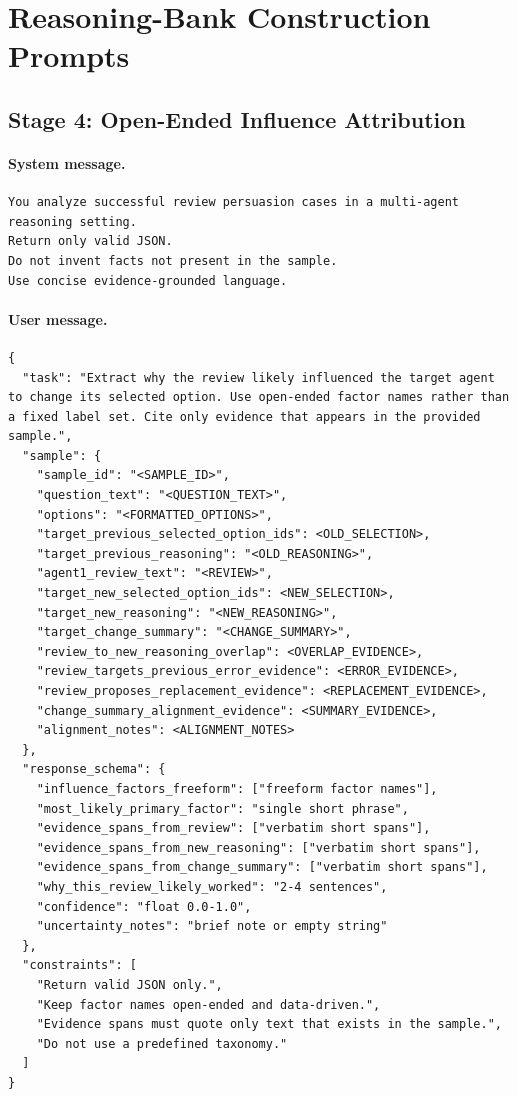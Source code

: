 \documentclass[sigconf,review,anonymous]{acmart}
\begin{document}
\section{Reasoning-Bank Construction Prompts}
\label{sec:corpus}

\subsection{Stage 4: Open-Ended Influence Attribution}

\paragraph{System message.}
\begin{lstlisting}[style=prompt]
You analyze successful review persuasion cases in a multi-agent reasoning setting.
Return only valid JSON.
Do not invent facts not present in the sample.
Use concise evidence-grounded language.
\end{lstlisting}

\paragraph{User message.}
\begin{lstlisting}[style=prompt]
{
  "task": "Extract why the review likely influenced the target agent to change its selected option. Use open-ended factor names rather than a fixed label set. Cite only evidence that appears in the provided sample.",
  "sample": {
    "sample_id": "<SAMPLE_ID>",
    "question_text": "<QUESTION_TEXT>",
    "options": "<FORMATTED_OPTIONS>",
    "target_previous_selected_option_ids": <OLD_SELECTION>,
    "target_previous_reasoning": "<OLD_REASONING>",
    "agent1_review_text": "<REVIEW>",
    "target_new_selected_option_ids": <NEW_SELECTION>,
    "target_new_reasoning": "<NEW_REASONING>",
    "target_change_summary": "<CHANGE_SUMMARY>",
    "review_to_new_reasoning_overlap": <OVERLAP_EVIDENCE>,
    "review_targets_previous_error_evidence": <ERROR_EVIDENCE>,
    "review_proposes_replacement_evidence": <REPLACEMENT_EVIDENCE>,
    "change_summary_alignment_evidence": <SUMMARY_EVIDENCE>,
    "alignment_notes": <ALIGNMENT_NOTES>
  },
  "response_schema": {
    "influence_factors_freeform": ["freeform factor names"],
    "most_likely_primary_factor": "single short phrase",
    "evidence_spans_from_review": ["verbatim short spans"],
    "evidence_spans_from_new_reasoning": ["verbatim short spans"],
    "evidence_spans_from_change_summary": ["verbatim short spans"],
    "why_this_review_likely_worked": "2-4 sentences",
    "confidence": "float 0.0-1.0",
    "uncertainty_notes": "brief note or empty string"
  },
  "constraints": [
    "Return valid JSON only.",
    "Keep factor names open-ended and data-driven.",
    "Evidence spans must quote only text that exists in the sample.",
    "Do not use a predefined taxonomy."
  ]
}
\end{lstlisting}
\end{document}
